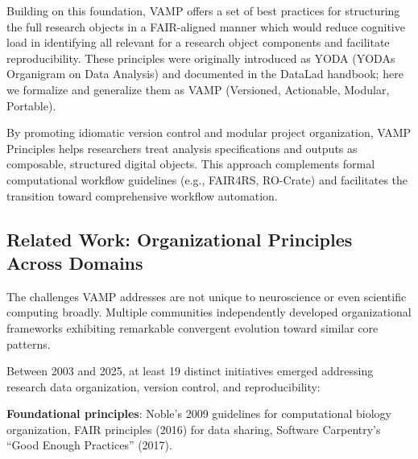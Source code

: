 \documentclass{article}
\begin{document}
Building on this foundation, VAMP offers a set of best practices for structuring the full research objects in a FAIR-aligned manner which would reduce cognitive load in identifying all relevant for a research object components and facilitate reproducibility.
These principles were originally introduced as YODA (YODAs Organigram on Data Analysis) and documented in the DataLad handbook; here we formalize and generalize them as VAMP (Versioned, Actionable, Modular, Portable).


By promoting idiomatic version control and modular project organization, VAMP Principles helps researchers treat analysis specifications and outputs as composable, structured digital objects.
This approach complements formal computational workflow guidelines (e.g., FAIR4RS, RO-Crate) and facilitates the transition toward comprehensive workflow automation.



\subsection{Related Work: Organizational Principles Across Domains}

The challenges VAMP addresses are not unique to neuroscience or even scientific computing broadly.
Multiple communities independently developed organizational frameworks exhibiting remarkable convergent evolution toward similar core patterns.

Between 2003 and 2025, at least 19 distinct initiatives emerged addressing research data organization, version control, and reproducibility:

\textbf{Foundational principles}: Noble's 2009 guidelines for computational biology organization, FAIR principles (2016) for data sharing, Software Carpentry's ``Good Enough Practices'' (2017).
\end{document}
